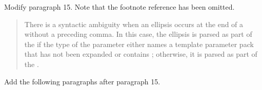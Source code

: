 Modify paragraph 15. Note that the footnote reference has been
omitted.

\begin{quote}
\setcounter{Paras}{14}
\pnum
There is a syntactic ambiguity when an ellipsis occurs at the end of a 
 without a preceding comma. In this 
case, the ellipsis is parsed as part of the  
if the type of the parameter either names a template parameter pack that has 
not been expanded or contains 
; 
otherwise, it is parsed as part
of the .
\end{quote}

Add the following paragraphs after paragraph 15.

